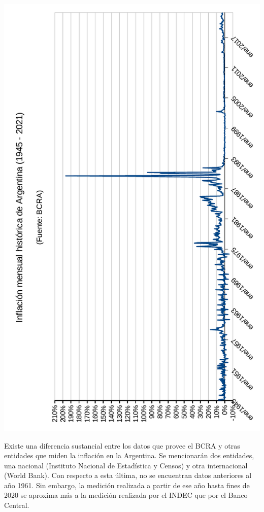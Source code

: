 \documentclass[12pt,a4paper,twoside]{book}
\begin{document}
\begin{center}
\includegraphics[scale=0.975]{img/infl-bcra.pdf}
\end{center}
\newpage

Existe una diferencia sustancial entre los datos que provee el BCRA y otras entidades que miden la inflación en la Argentina. Se mencionarán dos entidades, una nacional (Instituto Nacional de Estadística y Censos) y otra internacional (World Bank). Con respecto a esta última, no se encuentran datos anteriores al año 1961. Sin embargo, la medición realizada a partir de ese año hasta fines de 2020 se aproxima más a la medición realizada por el INDEC que por el Banco Central.
\end{document}
